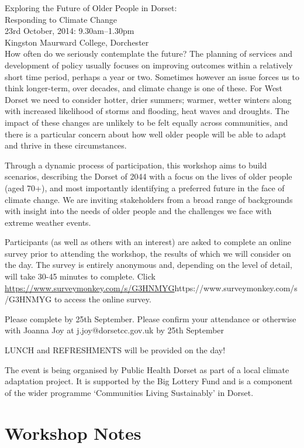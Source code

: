 Exploring the Future of Older People in Dorset:\\ 
Responding to Climate Change\\
23rd October, 2014: 9.30am--1.30pm\\
Kingston Maurward College, Dorchester\\

How often do we seriously contemplate the future?  The planning of services and development of policy usually focuses on improving outcomes within a relatively short time period, perhaps a year or two.  Sometimes however an issue forces us to think longer-term, over decades, and climate change is one of these.  For West Dorset we need to consider hotter, drier summers; warmer, wetter winters along with increased likelihood of storms and flooding, heat waves and droughts.  The impact of these changes are unlikely to be felt equally across communities, and there is a particular concern about how well older people will be able to adapt and thrive in these circumstances. 

Through a dynamic process of participation, this workshop aims to build scenarios, describing the Dorset of 2044 with a focus on the lives of older people (aged 70+), and most importantly identifying a preferred future in the face of climate change.  We are inviting stakeholders from a broad range of backgrounds with insight into the needs of older people and the challenges we face with extreme weather events.

Participants (as well as others with an interest) are asked to complete an online survey prior to attending the workshop, the results of which we will consider on the day.  The survey is entirely anonymous and, depending on the level of detail, will take 30-45 minutes to complete. Click \url{https://www.surveymonkey.com/s/G3HNMYG}{https://www.surveymonkey.com/s/G3HNMYG} to access the online survey.

Please complete by 25th September. Please confirm your attendance or otherwise with Joanna Joy at j.joy@dorsetcc.gov.uk by 25th September

LUNCH and REFRESHMENTS will be provided on the day!

The event is being organised by Public Health Dorset as part of a local climate adaptation project.  It is supported by the Big Lottery Fund and is a component of the wider programme `Communities Living Sustainably' in Dorset. 

\section{Workshop Notes}

